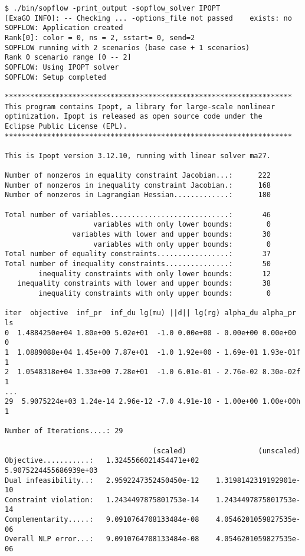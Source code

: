 \begin{lstlisting}
$ ./bin/sopflow -print_output -sopflow_solver IPOPT
[ExaGO INFO]: -- Checking ... -options_file not passed    exists: no
SOPFLOW: Application created
Rank[0]: color = 0, ns = 2, sstart= 0, send=2
SOPFLOW running with 2 scenarios (base case + 1 scenarios)
Rank 0 scenario range [0 -- 2]
SOPFLOW: Using IPOPT solver
SOPFLOW: Setup completed

********************************************************************
This program contains Ipopt, a library for large-scale nonlinear 
optimization. Ipopt is released as open source code under the 
Eclipse Public License (EPL).
********************************************************************

This is Ipopt version 3.12.10, running with linear solver ma27.

Number of nonzeros in equality constraint Jacobian...:      222
Number of nonzeros in inequality constraint Jacobian.:      168
Number of nonzeros in Lagrangian Hessian.............:      180

Total number of variables............................:       46
                     variables with only lower bounds:        0
                variables with lower and upper bounds:       30
                     variables with only upper bounds:        0
Total number of equality constraints.................:       37
Total number of inequality constraints...............:       50
        inequality constraints with only lower bounds:       12
   inequality constraints with lower and upper bounds:       38
        inequality constraints with only upper bounds:        0

iter  objective  inf_pr  inf_du lg(mu) ||d|| lg(rg) alpha_du alpha_pr  ls
0  1.4884250e+04 1.80e+00 5.02e+01  -1.0 0.00e+00 - 0.00e+00 0.00e+00   0
1  1.0889088e+04 1.45e+00 7.87e+01  -1.0 1.92e+00 - 1.69e-01 1.93e-01f  1
2  1.0548318e+04 1.33e+00 7.28e+01  -1.0 6.01e-01 - 2.76e-02 8.30e-02f  1
...
29  5.9075224e+03 1.24e-14 2.96e-12 -7.0 4.91e-10 - 1.00e+00 1.00e+00h  1

Number of Iterations....: 29

                                   (scaled)                 (unscaled)
Objective...........:   1.3245566021454471e+02    5.9075224455686939e+03
Dual infeasibility..:   2.9592247352450450e-12    1.3198142319192901e-10
Constraint violation:   1.2434497875801753e-14    1.2434497875801753e-14
Complementarity.....:   9.0910764708133484e-08    4.0546201059827535e-06
Overall NLP error...:   9.0910764708133484e-08    4.0546201059827535e-06



\end{lstlisting}
